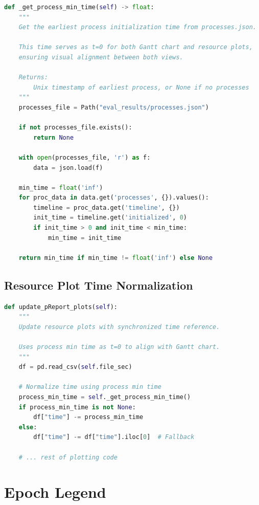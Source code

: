 \documentclass[11pt,a4paper]{article}
\begin{document}
\begin{lstlisting}[language=Python]
def _get_process_min_time(self) -> float:
    """
    Get the earliest process initialization time from processes.json.
    
    This time serves as t=0 for both Gantt chart and resource plots,
    ensuring visual alignment between both views.
    
    Returns:
        Unix timestamp of earliest process, or None if no processes
    """
    processes_file = Path("eval_results/processes.json")
    
    if not processes_file.exists():
        return None
    
    with open(processes_file, 'r') as f:
        data = json.load(f)
    
    min_time = float('inf')
    for proc_data in data.get('processes', {}).values():
        timeline = proc_data.get('timeline', {})
        init_time = timeline.get('initialized', 0)
        if init_time > 0 and init_time < min_time:
            min_time = init_time
    
    return min_time if min_time != float('inf') else None
\end{lstlisting}

\subsection{Resource Plot Time Normalization}

\begin{lstlisting}[language=Python]
def update_pReport_plots(self):
    """
    Update resource plots with synchronized time reference.
    
    Uses process min time as t=0 to align with Gantt chart.
    """
    df = pd.read_csv(self.file_sec)
    
    # Normalize time using process min time
    process_min_time = self._get_process_min_time()
    if process_min_time is not None:
        df["time"] -= process_min_time
    else:
        df["time"] -= df["time"].iloc[0]  # Fallback
    
    # ... rest of plotting code
\end{lstlisting}

\section{Epoch Legend}
\end{document}

